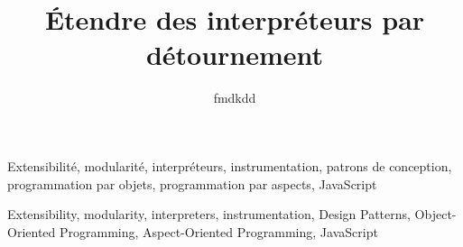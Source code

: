 

\newcommand{\titlefr}{Étendre des interpréteurs par détournement}
\newcommand{\subtitlefr}{Comment j'ai appris à ne plus m'en faire et à aimer le code}
\newcommand{\titleen}{Extending interpreters by diversion}

\title{\titlefr}
\author{fmdkdd}





\begin{resume}

\end{resume}

\begin{motscles}
Extensibilité, modularité, interpréteurs, instrumentation, patrons de
conception, programmation par objets, programmation par aspects, JavaScript
\end{motscles}

\begin{abstract_}

\end{abstract_}

\begin{keywords}
Extensibility, modularity, interpreters, instrumentation, Design Patterns,
Object-Oriented Programming, Aspect-Oriented Programming, JavaScript
\end{keywords}





\frontmatter
{}
\pagestyle{empty}
\tableofcontents*
\clearpage
\restoregeometry


\pagestyle{headings}
\mainmatter


\backmatter

\printbibliography
\restoregeometry




